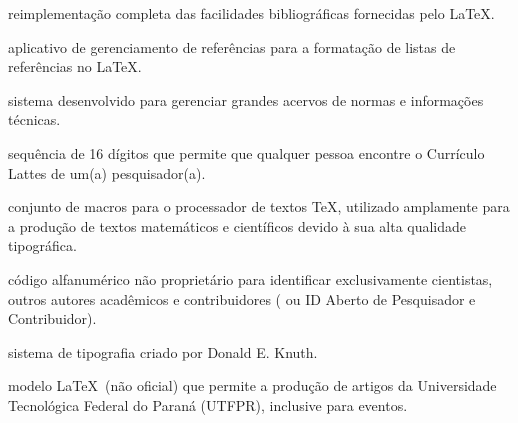
\begin{Glossary}%
\item[Bib\LaTeX] reimplementação completa das facilidades bibliográficas fornecidas pelo \LaTeX.
\item[Bib\TeX] aplicativo de gerenciamento de referências para a formatação de listas de referências no \LaTeX.
\item[GEDWeb] sistema desenvolvido para gerenciar grandes acervos de normas e informações técnicas.
\item[ID Lattes] sequência de 16 dígitos que permite que qualquer pessoa encontre o Currículo Lattes de um{(a)} pesquisador{(a)}.
\item[\LaTeX] conjunto de macros para o processador de textos \TeX, utilizado amplamente para a produção de textos matemáticos e científicos devido à sua alta qualidade tipográfica.
\item[ORCID] código alfanumérico não proprietário para identificar exclusivamente cientistas, outros autores acadêmicos e contribuidores ( ou ID Aberto de Pesquisador e Contribuidor).
\item[\TeX] sistema de tipografia criado por Donald E. Knuth.
\item[\UTFPR-Article] modelo \LaTeX\ (não oficial) que permite a produção de artigos da Universidade Tecnológica Federal do Paraná (UTFPR), inclusive para eventos.
\end{Glossary}

